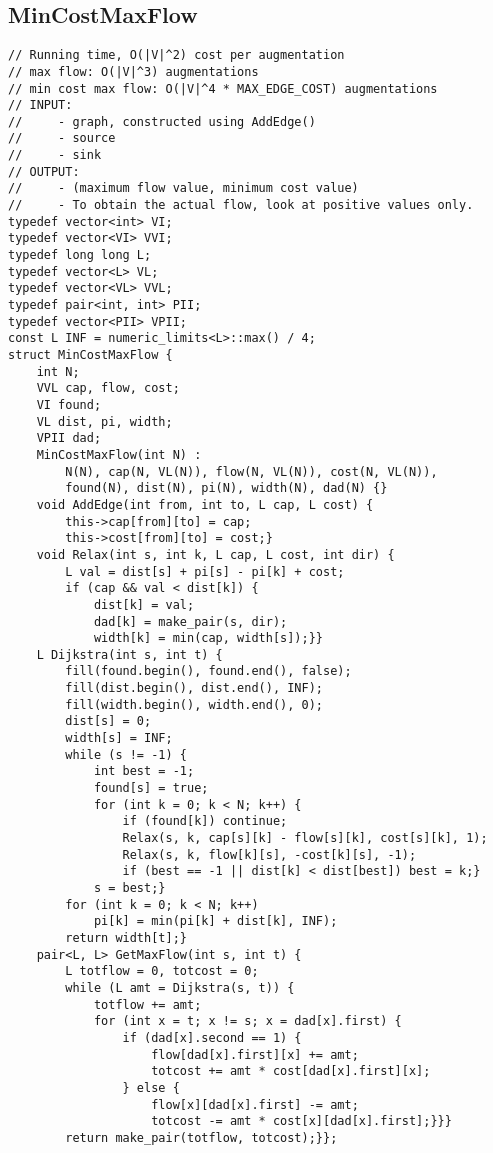 \documentclass[8pt, oneside]{extarticle}
\begin{document}
\begin{multicols}{3}
\subsection{MinCostMaxFlow}
\begin{lstlisting}
// Running time, O(|V|^2) cost per augmentation
// max flow: O(|V|^3) augmentations
// min cost max flow: O(|V|^4 * MAX_EDGE_COST) augmentations
// INPUT: 
//     - graph, constructed using AddEdge()
//     - source
//     - sink
// OUTPUT:
//     - (maximum flow value, minimum cost value)
//     - To obtain the actual flow, look at positive values only.
typedef vector<int> VI;
typedef vector<VI> VVI;
typedef long long L;
typedef vector<L> VL;
typedef vector<VL> VVL;
typedef pair<int, int> PII;
typedef vector<PII> VPII;
const L INF = numeric_limits<L>::max() / 4;
struct MinCostMaxFlow {
    int N;
    VVL cap, flow, cost;
    VI found;
    VL dist, pi, width;
    VPII dad;
    MinCostMaxFlow(int N) : 
        N(N), cap(N, VL(N)), flow(N, VL(N)), cost(N, VL(N)), 
        found(N), dist(N), pi(N), width(N), dad(N) {}
    void AddEdge(int from, int to, L cap, L cost) {
        this->cap[from][to] = cap;
        this->cost[from][to] = cost;}
    void Relax(int s, int k, L cap, L cost, int dir) {
        L val = dist[s] + pi[s] - pi[k] + cost;
        if (cap && val < dist[k]) {
            dist[k] = val;
            dad[k] = make_pair(s, dir);
            width[k] = min(cap, width[s]);}}
    L Dijkstra(int s, int t) {
        fill(found.begin(), found.end(), false);
        fill(dist.begin(), dist.end(), INF);
        fill(width.begin(), width.end(), 0);
        dist[s] = 0;
        width[s] = INF;
        while (s != -1) {
            int best = -1;
            found[s] = true;
            for (int k = 0; k < N; k++) {
                if (found[k]) continue;
                Relax(s, k, cap[s][k] - flow[s][k], cost[s][k], 1);
                Relax(s, k, flow[k][s], -cost[k][s], -1);
                if (best == -1 || dist[k] < dist[best]) best = k;}
            s = best;}
        for (int k = 0; k < N; k++)
            pi[k] = min(pi[k] + dist[k], INF);
        return width[t];}
    pair<L, L> GetMaxFlow(int s, int t) {
        L totflow = 0, totcost = 0;
        while (L amt = Dijkstra(s, t)) {
            totflow += amt;
            for (int x = t; x != s; x = dad[x].first) {
                if (dad[x].second == 1) {
                    flow[dad[x].first][x] += amt;
                    totcost += amt * cost[dad[x].first][x];
                } else {
                    flow[x][dad[x].first] -= amt;
                    totcost -= amt * cost[x][dad[x].first];}}}
        return make_pair(totflow, totcost);}};
\end{lstlisting}

\end{multicols}
\end{document}
